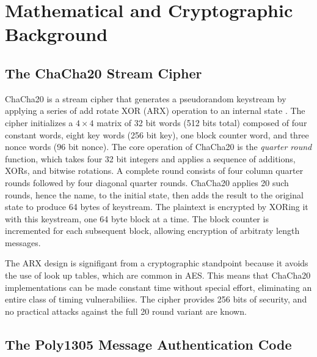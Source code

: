 \documentclass[12pt]{article}
\begin{document}
\section{Mathematical and Cryptographic Background}

    \subsection{The ChaCha20 Stream Cipher}

        ChaCha20 is a stream cipher that generates a pseudorandom keystream by applying a series of add rotate XOR (ARX) operation to an internal state \cite{bernstein2008}. The cipher initializes a $4 \times 4$ matrix of 32 bit words (512 bits total) composed of four constant words, eight key words (256 bit key), one block counter word, and three nonce words (96 bit nonce). The core operation of ChaCha20 is the \textit{quarter round} function, which takes four 32 bit integers and applies a sequence of additions, XORs, and bitwise rotations. A complete round consists of four column quarter rounds followed by four diagonal quarter rounds. ChaCha20 applies 20 such rounds, hence the name, to the initial state, then adds the result to the original state to produce 64 bytes of keystream. The plaintext is encrypted by XORing it with this keystream, one 64 byte block at a time. The block counter is incremented for each subsequent block, allowing encryption of arbitraty length messages.

        The ARX design is signifigant from a cryptographic standpoint because it avoids the use of look up tables, which are common in AES. This means that ChaCha20 implementations can be made constant time without special effort, eliminating an entire class of timing vulnerabiliies. The cipher provides 256 bits of security, and no practical attacks against the full 20 round variant are known.

    \subsection{The Poly1305 Message Authentication Code}
\end{document}
